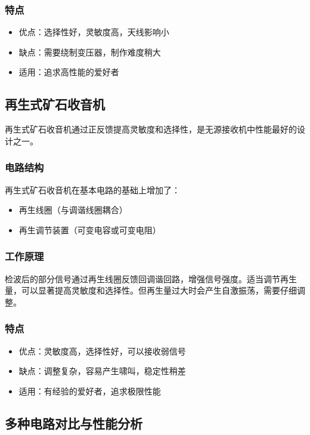 \documentclass[12pt,UTF8]{ctexbook}
\begin{document}
\subsubsection{特点}
\begin{itemize}[leftmargin=3.5em]
    \item 优点：选择性好，灵敏度高，天线影响小
    \item 缺点：需要绕制变压器，制作难度稍大
    \item 适用：追求高性能的爱好者
\end{itemize}

\subsection{再生式矿石收音机}

再生式矿石收音机通过正反馈提高灵敏度和选择性，是无源接收机中性能最好的设计之一。

\subsubsection{电路结构}

再生式矿石收音机在基本电路的基础上增加了：
\begin{itemize}[leftmargin=3.5em]
    \item 再生线圈（与调谐线圈耦合）
    \item 再生调节装置（可变电容或可变电阻）
\end{itemize}

\subsubsection{工作原理}

检波后的部分信号通过再生线圈反馈回调谐回路，增强信号强度。适当调节再生量，可以显著提高灵敏度和选择性。但再生量过大时会产生自激振荡，需要仔细调整。

\subsubsection{特点}
\begin{itemize}[leftmargin=3.5em]
    \item 优点：灵敏度高，选择性好，可以接收弱信号
    \item 缺点：调整复杂，容易产生啸叫，稳定性稍差
    \item 适用：有经验的爱好者，追求极限性能
\end{itemize}

\subsection{多种电路对比与性能分析}
\end{document}
